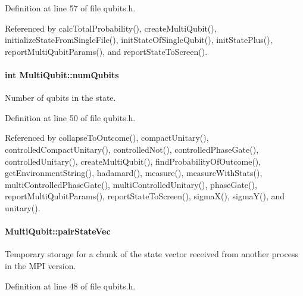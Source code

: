 Definition at line 57 of file qubits.\+h.



Referenced by calc\+Total\+Probability(), create\+Multi\+Qubit(), initialize\+State\+From\+Single\+File(), init\+State\+Of\+Single\+Qubit(), init\+State\+Plus(), report\+Multi\+Qubit\+Params(), and report\+State\+To\+Screen().

\paragraph[{\texorpdfstring{num\+Qubits}{numQubits}}]{\setlength{\rightskip}{0pt plus 5cm}int Multi\+Qubit\+::num\+Qubits}\hypertarget{structMultiQubit_ab5b9795bdc6fb5855e1974dcbbaeb36f}{}\label{structMultiQubit_ab5b9795bdc6fb5855e1974dcbbaeb36f}


Number of qubits in the state. 



Definition at line 50 of file qubits.\+h.



Referenced by collapse\+To\+Outcome(), compact\+Unitary(), controlled\+Compact\+Unitary(), controlled\+Not(), controlled\+Phase\+Gate(), controlled\+Unitary(), create\+Multi\+Qubit(), find\+Probability\+Of\+Outcome(), get\+Environment\+String(), hadamard(), measure(), measure\+With\+Stats(), multi\+Controlled\+Phase\+Gate(), multi\+Controlled\+Unitary(), phase\+Gate(), report\+Multi\+Qubit\+Params(), report\+State\+To\+Screen(), sigma\+X(), sigma\+Y(), and unitary().

\paragraph[{\texorpdfstring{pair\+State\+Vec}{pairStateVec}}]{ Multi\+Qubit\+::pair\+State\+Vec}\hypertarget{structMultiQubit_a76f7db4eab52d2b30f58f973ada809c5}{}\label{structMultiQubit_a76f7db4eab52d2b30f58f973ada809c5}


Temporary storage for a chunk of the state vector received from another process in the M\+PI version. 



Definition at line 48 of file qubits.\+h.




